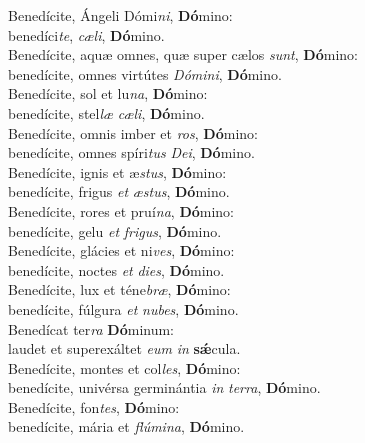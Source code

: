 \evenverse Benedícite, Ángeli Dómi\textit{ni}, \textbf{Dó}mino:~\*\\
\evenverse benedíci\textit{te}, \textit{cæ}\textit{li}, \textbf{Dó}mino.\\
\oddverse Benedícite, aquæ omnes, quæ super cælos \textit{sunt}, \textbf{Dó}mino:~\*\\
\oddverse benedícite, omnes virtútes \textit{Dó}\textit{mi}\textit{ni}, \textbf{Dó}mino.\\
\evenverse Benedícite, sol et lu\textit{na}, \textbf{Dó}mino:~\*\\
\evenverse benedícite, stel\textit{læ} \textit{cæ}\textit{li}, \textbf{Dó}mino.\\
\oddverse Benedícite, omnis imber et \textit{ros}, \textbf{Dó}mino:~\*\\
\oddverse benedícite, omnes spíri\textit{tus} \textit{De}\textit{i}, \textbf{Dó}mino.\\
\evenverse Benedícite, ignis et æ\textit{stus}, \textbf{Dó}mino:~\*\\
\evenverse benedícite, frigus \textit{et} \textit{æ}\textit{stus}, \textbf{Dó}mino.\\
\oddverse Benedícite, rores et pruí\textit{na}, \textbf{Dó}mino:~\*\\
\oddverse benedícite, gelu \textit{et} \textit{fri}\textit{gus}, \textbf{Dó}mino.\\
\evenverse Benedícite, glácies et ni\textit{ves}, \textbf{Dó}mino:~\*\\
\evenverse benedícite, noctes \textit{et} \textit{di}\textit{es}, \textbf{Dó}mino.\\
\oddverse Benedícite, lux et téne\textit{bræ}, \textbf{Dó}mino:~\*\\
\oddverse benedícite, fúlgura \textit{et} \textit{nu}\textit{bes}, \textbf{Dó}mino.\\
\evenverse Benedícat ter\textit{ra} \textbf{Dó}minum:~\*\\
\evenverse laudet et superexáltet \textit{e}\textit{um} \textit{in} \textbf{sǽ}cula.\\
\oddverse Benedícite, montes et col\textit{les}, \textbf{Dó}mino:~\*\\
\oddverse benedícite, univérsa germinántia \textit{in} \textit{ter}\textit{ra}, \textbf{Dó}mino.\\
\evenverse Benedícite, fon\textit{tes}, \textbf{Dó}mino:~\*\\
\evenverse benedícite, mária et \textit{flú}\textit{mi}\textit{na}, \textbf{Dó}mino.\\
